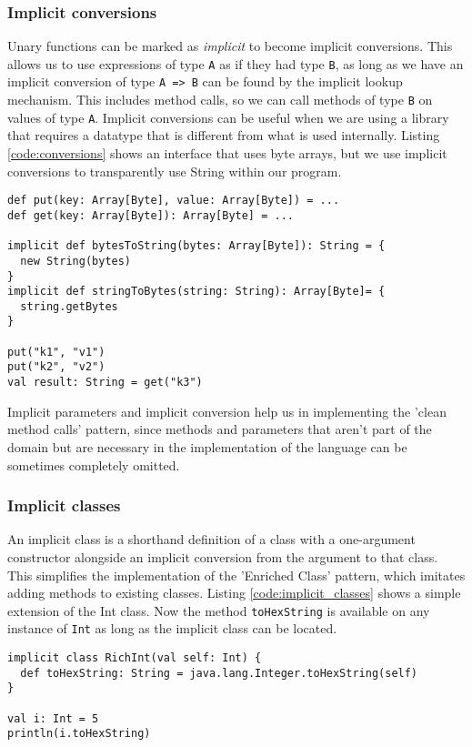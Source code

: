 \subsubsection{Implicit conversions}
Unary functions can be marked as {\it implicit} to become implicit conversions.
This allows us to use expressions of type \texttt{A} as if they had type \texttt{B}, as long as we have an implicit conversion of type \texttt{A => B} can be found by the implicit lookup mechanism.
This includes method calls, so we can call methods of type \texttt{B} on values of type \texttt{A}.
Implicit conversions can be useful when we are using a library that requires a datatype that is different from what is used internally.
Listing \ref{code:conversions} shows an interface that uses byte arrays, but we use implicit conversions to transparently use String within our program.

\begin{lstlisting}[caption=Implicit conversions, label=code:conversions, float]
def put(key: Array[Byte], value: Array[Byte]) = ...
def get(key: Array[Byte]): Array[Byte] = ...

implicit def bytesToString(bytes: Array[Byte]): String = {
  new String(bytes)
}
implicit def stringToBytes(string: String): Array[Byte]= {
  string.getBytes
}

put("k1", "v1")
put("k2", "v2")
val result: String = get("k3")
\end{lstlisting}

Implicit parameters and implicit conversion help us in implementing the 'clean method calls' pattern, since methods and parameters that aren't part of the domain but are necessary in the implementation of the language can be sometimes completely omitted.

\subsubsection{Implicit classes}
An implicit class is a shorthand definition of a class with a one-argument constructor alongside an implicit conversion from the argument to that class.
This simplifies the implementation of the 'Enriched Class' pattern, which imitates adding methods to existing classes.
Listing \ref{code:implicit_classes} shows a simple extension of the Int class.
Now the method \texttt{toHexString} is available on any instance of \texttt{Int} as long as the implicit class can be located.

\begin{lstlisting}[caption=Implicit class, label=code:implicit_classes, float]
implicit class RichInt(val self: Int) {
  def toHexString: String = java.lang.Integer.toHexString(self)
}

val i: Int = 5
println(i.toHexString)
\end{lstlisting}


